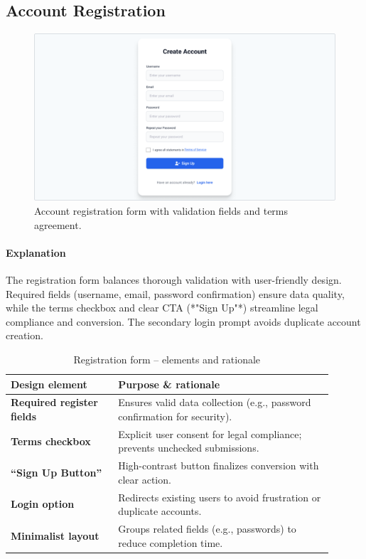 \documentclass[12pt]{article}
\begin{document}
	\subsection{Account Registration}\label{subsec:account-registration}

	\begin{figure}[H]
		\centering
		\includegraphics[width=0.6\linewidth]{pictures/main/RegisterAccount_Figma}%
		\caption{Account registration form with validation fields and terms agreement.}
		\label{fig:ui-register}
	\end{figure}

	\paragraph{Explanation}%
	The registration form balances thorough validation with user-friendly design.
	Required fields (username, email, password confirmation) ensure data quality, while the terms checkbox and clear CTA (*"Sign Up"*) streamline legal compliance and conversion.
	The secondary login prompt avoids duplicate account creation.

	\begin{table}[H]
		\centering
		\caption{Registration form – elements and rationale}
		\label{tab:register-elements}
		\begin{tabular}{p{0.30\linewidth} p{0.60\linewidth}}
			\toprule
			\textbf{Design element} & \textbf{Purpose \& rationale} \\ \midrule
			\textbf{Required register fields}   & Ensures valid data collection (e.g., password confirmation for security). \\
			\textbf{Terms checkbox}          	& Explicit user consent for legal compliance; prevents unchecked submissions. \\
			\textbf{``Sign Up Button''}      	& High-contrast button finalizes conversion with clear action. \\
			\textbf{Login option}            	& Redirects existing users to avoid frustration or duplicate accounts. \\
			\textbf{Minimalist layout}       	& Groups related fields (e.g., passwords) to reduce completion time. \\
			\bottomrule
		\end{tabular}
	\end{table}
\end{document}
